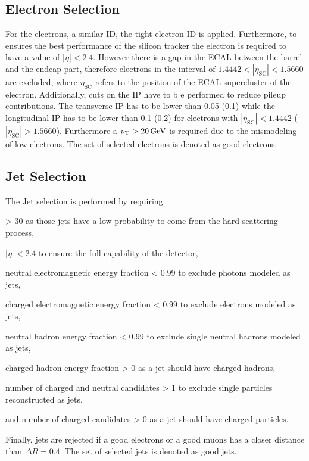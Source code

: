 \subsection{Electron Selection}
For the electrons, a similar ID, the tight electron ID is applied. Furthermore, to ensures the best performance of the silicon tracker the electron is required to have a value of $|\eta| < 2.4$. However there is a gap in the ECAL between the barrel and the endcap part, therefore electrons in the interval of $1.4442 < |\eta_\textrm{SC}| < 1.5660$ are excluded, where $\eta_\textrm{SC}$ refers to the position of the ECAL supercluster of the electron. Additionally, cuts on the IP have to b e performed to reduce pileup contributions. The transverse IP has to be lower than 0.05 (0.1) while the longitudinal IP has to be lower than 0.1 (0.2) for electrons with $|\eta_\textrm{SC}| < 1.4442$ ($|\eta_\textrm{SC}| > 1.5660$). Furthermore a $p_\mathrm{T} > 20\,\mathrm{GeV}$ is required due to the mismodeling of low \pt electrons. The set of selected electrons is denoted as good electrons.

\subsection{Jet Selection}
The Jet selection is performed by requiring
\begin{description}
\setlength{\itemsep}{-20pt}
\item[•] \pt > 30 as those jets have a low probability to come from the hard scattering process,\\
\item[•] $|\eta| < 2.4$ to ensure the full capability of the detector,\\
\item[•] neutral electromagnetic energy fraction < 0.99 to exclude photons modeled as jets,\\
\item[•] charged electromagnetic energy fraction < 0.99 to exclude electrons modeled as jets,\\
\item[•] neutral hadron energy fraction < 0.99 to exclude single neutral hadrons modeled as jets,\\
\item[•] charged hadron energy fraction > 0 as a jet should have charged hadrons,\\
\item[•] number of charged and neutral candidates > 1 to exclude single particles reconstructed as jets,\\
\item[•] and number of charged candidates > 0 as a jet should have charged particles.
\end{description}
Finally, jets are rejected if a good electrons or a good muons has a closer distance than $\Delta R = 0.4$. The set of selected jets is denoted as good jets.

